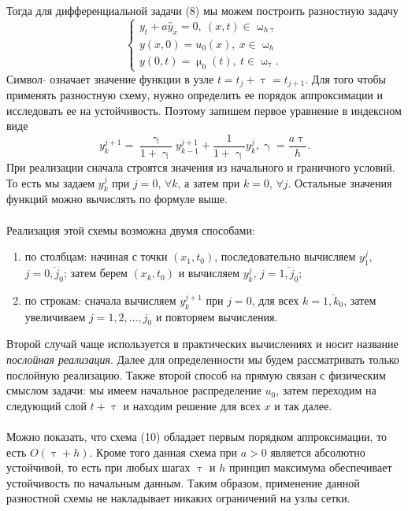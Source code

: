 \documentclass[a4paper, 12pt]{report}
\numberwithin{equation}{section}
\newcommand{\ol}{\overline}
\renewcommand{\gamma}{\upgamma}
\renewcommand{\tau}{\uptau}
\renewcommand{\mu}{\upmu}
\renewcommand{\omega}{\upomega}
\begin{document}
		 Тогда для дифференциальной задачи (8) мы можем построить разностную задачу
		 \begin{equation}
		 	\begin{cases}
		 		y_t + a \hat y_{\ol x} =0,\ (x,t)\in \omega_{h\tau}\\
		 	y(x,0) = u_0(x),\ x \in \omega_h\\
		 	y(0,t) = \mu_0(t),\ t \in \omega_\tau.
		 	\end{cases}
		 \end{equation}
		 Символ $\hat{}$ означает значение функции в узле $t = t_j + \tau = t_{j+1}$. Для того чтобы применять разностную схему, нужно определить ее порядок аппроксимации и исследовать ее на устойчивость. Поэтому запишем первое уравнение в индексном виде
		 $$y_{k}^{j+1} = \dfrac{\gamma}{1+ \gamma} y_{k-1}^{j+1} + \dfrac{1}{1+\gamma}y_k^j, \gamma = \dfrac{a\tau}{h}.$$
		 При реализации сначала строятся значения из начального и граничного условий. То есть мы задаем $y_k^j$ при $j = 0$, $\forall k$, а затем при $k=0$, $\forall j$. Остальные значения функций можно вычислять по формуле выше. \\\\
		 Реализация этой схемы возможна двумя способами:
		 \begin{enumerate}
		 	\item по столбцам: начиная с точки $(x_1,t_0)$, последовательно вычисляем $y_1^j$, $j = \overline{0, j_0}$; затем берем $(x_k, t_0)$ и вычисляем $y_k^j$, $j = \ol{1,j_0}$;
		 	\item по строкам: сначала вычисляем $y_k^{j+1}$ при $j=0$, для всех $k = \ol{1, k_0}$, затем увеличиваем $j = 1,2,\ldots, j_0$ и повторяем вычисления.
		 \end{enumerate}
		 Второй случай чаще используется в практических вычислениях и носит название \textit{послойная реализация}. Далее для определенности мы будем рассматривать только послойную реализацию. Также второй способ на прямую связан с физическим смыслом задачи: мы имеем начальное распределение $u_0$, затем переходим на следующий слой $t+\tau$ и находим решение для всех $x$ и так далее.\\\\
		 Можно показать, что схема (10) обладает первым порядком аппроксимации, то есть $O(\tau + h)$. Кроме того данная схема при $a>0$ является абсолютно устойчивой, то есть при любых шагах $\tau$ и $h$ принцип максимума обеспечивает устойчивость по начальным данным. Таким образом, применение данной разностной схемы не накладывает никаких ограничений на узлы сетки.\\\\
\end{document}
